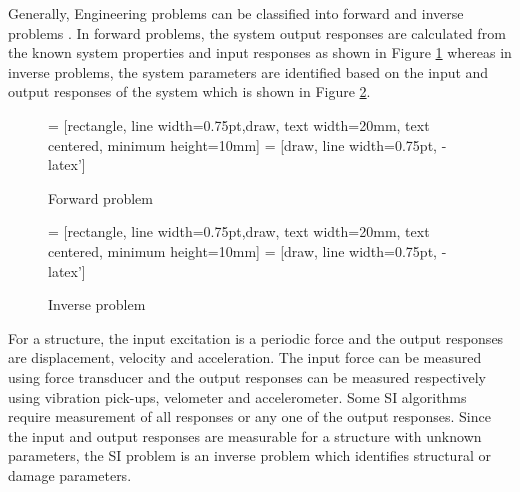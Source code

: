 \documentclass[BTech]{srmuthesis}
\begin{document}
Generally, Engineering problems can be classified into forward and inverse problems \citep{ssikoh}. In forward problems, the system output responses are calculated from the known system properties and input responses as shown in Figure \ref{fig:fp} whereas in inverse problems, the system parameters are identified based on the input and output responses of the system which is shown in Figure \ref{fig:ip}. 
\begin{figure}[htpb]
\centering
{} = [rectangle, line width=0.75pt,draw,  text width=20mm, text centered,  minimum height=10mm]
 = [draw, line width=0.75pt, -latex']
\caption{Forward problem}
\label{fig:fp}
\end{figure}
\begin{figure}[htpb]
\centering
{} = [rectangle, line width=0.75pt,draw,  text width=20mm, text centered,  minimum height=10mm]
 = [draw, line width=0.75pt, -latex']
\caption{Inverse problem}
\label{fig:ip}
\end{figure}
For a structure, the input excitation is a periodic force and the output responses are displacement, velocity and acceleration. The input force can be measured using force transducer and the output responses can be measured respectively using vibration pick-ups, velometer and accelerometer. Some \ac{SI} algorithms require measurement of all responses or any one of the output responses. Since the input and output responses are measurable for a structure with unknown parameters, the \ac{SI} problem is an inverse problem which identifies structural or damage parameters.\\ \vspace{-5mm}
\end{document}

